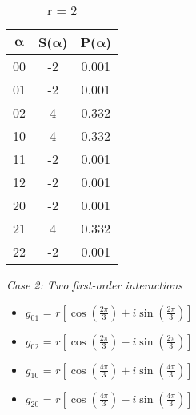 \begin{table}[h]
\begin{subtable}{.3\textwidth}
        \centering
        \caption{r = 2}
        \begin{tabular}{ccc}
            \toprule
             $\boldsymbol{\alpha}$ & S($\boldsymbol{\alpha}$) & P($\boldsymbol{\alpha}$)\\
            \midrule
            00 & -2 & 0.001 \\
            01 & -2 & 0.001 \\
            02 & 4 & 0.332 \\
            10 & 4 & 0.332 \\
            11 & -2 & 0.001 \\
            12 & -2 & 0.001 \\
            20 & -2 & 0.001 \\
            21 & 4 & 0.332 \\
            22 & -2 & 0.001 \\
          \bottomrule
        \end{tabular}
    \end{subtable}
\end{table}

\newpage

\noindent
\textit{Case 2: Two first-order interactions}

\begin{itemize}
    \item $g_{01}$ = $r\left[\cos\left( \frac{2\pi}{3}\right) + i \sin\left( \frac{2\pi}{3}\right)\right]$
    \item $g_{02}$ = $r\left[\cos\left( \frac{2\pi}{3}\right) - i \sin\left( \frac{2\pi}{3}\right)\right]$
    \item $g_{10}$ = $r\left[\cos\left( \frac{4\pi}{3}\right) + i \sin\left( \frac{4\pi}{3}\right)\right]$
    \item $g_{20}$ = $r\left[\cos\left( \frac{4\pi}{3}\right) - i \sin\left( \frac{4\pi}{3}\right)\right]$
\end{itemize}

